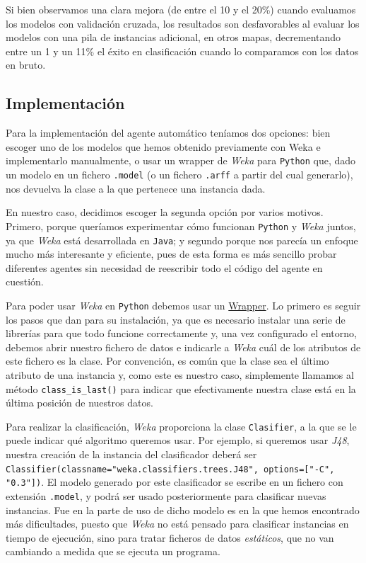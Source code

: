 \documentclass[12pt]{article}
\newcommand{\water}[1]{\textcolor{ocean}{#1}}
\begin{document}
\vspace{0.3cm}

Si bien observamos una clara mejora (de entre el 10 y el 20\%) cuando evaluamos los modelos con validación cruzada, los resultados son desfavorables al evaluar los modelos con una pila de instancias adicional, en otros mapas, decrementando entre un 1 y un 11\% el éxito en clasificación cuando lo comparamos con los datos en bruto.

\subsection{Implementación}

Para la implementación del agente automático teníamos dos opciones: bien escoger uno de los modelos que hemos obtenido previamente con Weka e implementarlo manualmente, o usar un wrapper de \emph{Weka} para \texttt{Python} que, dado un modelo en un fichero \texttt{.model} (o un fichero \texttt{.arff} a partir del cual generarlo), nos devuelva la clase a la que pertenece una instancia dada.

En nuestro caso, decidimos escoger la segunda opción por varios motivos. Primero, porque queríamos experimentar cómo funcionan \texttt{Python} y \emph{Weka} juntos, ya que \emph{Weka} está desarrollada en \texttt{Java}; y segundo porque nos parecía un enfoque mucho más interesante y eficiente, pues de esta forma es más sencillo probar diferentes agentes sin necesidad de reescribir todo el código del agente en cuestión.

Para poder usar \emph{Weka} en \texttt{Python} debemos usar un \href{https://pythonhosted.org/python-weka-wrapper/}{\water{Wrapper}}. Lo primero es seguir los pasos que dan para su instalación, ya que es necesario instalar una serie de librerías para que todo funcione correctamente y, una vez configurado el entorno, debemos abrir nuestro fichero de datos e indicarle a \emph{Weka} cuál de los atributos de este fichero es la clase. Por convención, es común que la clase sea el último atributo de una instancia y, como este es nuestro caso, simplemente llamamos al método \texttt{class\_is\_last()} para indicar que efectivamente nuestra clase está en la última posición de nuestros datos.

Para realizar la clasificación, \emph{Weka} proporciona la clase \texttt{Clasifier}, a la que se le puede indicar qué algoritmo queremos usar. Por ejemplo, si queremos usar \emph{J48}, nuestra creación de la instancia del clasificador deberá ser \texttt{Classifier(classname="weka.classifiers.trees.J48", options=["-C", "0.3"])}. El modelo generado por este clasificador se escribe en un fichero con extensión \texttt{.model}, y podrá ser usado posteriormente para clasificar nuevas instancias. Fue en la parte de uso de dicho modelo es en la que hemos encontrado más dificultades, puesto que \emph{Weka} no está pensado para clasificar instancias en tiempo de ejecución, sino para tratar ficheros de datos \emph{estáticos}, que no van cambiando a medida que se ejecuta un programa.
\end{document}
